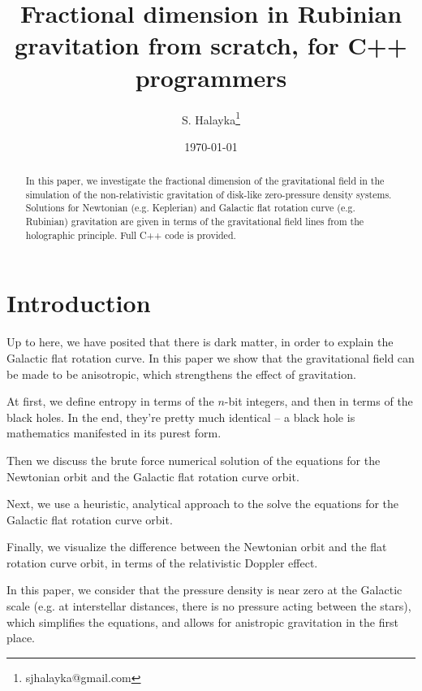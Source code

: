 \documentclass[12pt]{article}
\title{Fractional dimension in Rubinian gravitation from scratch, for C++ programmers}
\author{S. Halayka\footnote{sjhalayka@gmail.com}}
\date{\today\;\currenttime}
\begin{document}
 
\maketitle

\begin{abstract}

In this paper, we investigate the fractional dimension of the gravitational field in the simulation of the non-relativistic gravitation of disk-like zero-pressure density systems.
Solutions for Newtonian (e.g. Keplerian) and Galactic flat rotation curve (e.g. Rubinian) gravitation are given in terms of the gravitational field lines from the holographic principle.
Full C++ code is provided.
\end{abstract}



\section{Introduction}

Up to here, we have posited that there is dark matter, in order to explain the Galactic flat rotation curve.
In this paper we show that the gravitational field can be made to be anisotropic, which strengthens the effect of gravitation.

At first, we define entropy in terms of the $n$-bit integers, and then in terms of the black holes. 
In the end, they're pretty much identical -- a black hole is mathematics manifested in its purest form.

Then we discuss the brute force numerical solution of the equations for the Newtonian orbit and the Galactic flat rotation curve orbit.

Next, we use a heuristic, analytical approach to the solve the equations for the Galactic flat rotation curve orbit.

Finally, we visualize the difference between the Newtonian orbit and the flat rotation curve orbit, in terms of the relativistic Doppler effect.

In this paper, we consider that the pressure density is near zero at the Galactic scale (e.g. at interstellar distances, there is no pressure acting between the stars), which simplifies the equations, and allows for anistropic gravitation in the first place.
\end{document}
